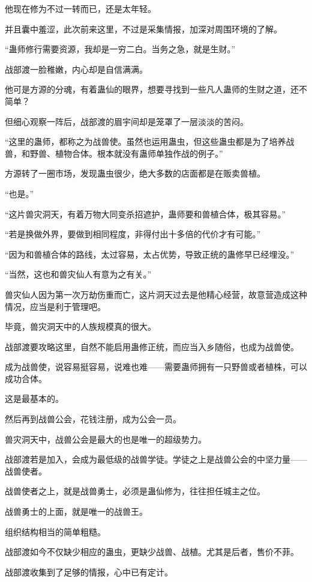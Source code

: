 \begin{this_body}
他现在修为不过一转而已，还是太年轻。

并且囊中羞涩，此次前来这里，不过是采集情报，加深对周围环境的了解。

“蛊师修行需要资源，我却是一穷二白。当务之急，就是生财。”

战部渡一脸稚嫩，内心却是自信满满。

他可是方源的分魂，有着蛊仙的眼界，想要寻找到一些凡人蛊师的生财之道，还不简单？

但细心观察一阵后，战部渡的眉宇间却是笼罩了一层淡淡的苦闷。

“这里的蛊师，都称之为战兽使。虽然也运用蛊虫，但这些蛊虫都是为了培养战兽，和野兽、植物合体。根本就没有蛊师单独作战的例子。”

方源转了一圈市场，发现蛊虫很少，绝大多数的店面都是在贩卖兽植。

“也是。”

“这片兽灾洞天，有着万物大同变杀招遮护，蛊师要和兽植合体，极其容易。”

“若是换做外界，要做到相同程度，非得付出十多倍的代价才有可能。”

“因为和兽植合体的路线，太过容易，太占优势，导致正统的蛊修早已经埋没。”

“当然，这也和兽灾仙人有意为之有关。”

兽灾仙人因为第一次万劫伤重而亡，这片洞天过去是他精心经营，故意营造成这种情况，应当是利于管理吧。

毕竟，兽灾洞天中的人族规模真的很大。

战部渡要攻略这里，自然不能启用蛊修正统，而应当入乡随俗，也成为战兽使。

成为战兽使，说容易挺容易，说难也难——需要蛊师拥有一只野兽或者植株，可以成功合体。

这是最基本的。

然后再到战兽公会，花钱注册，成为公会一员。

兽灾洞天中，战兽公会是最大的也是唯一的超级势力。

战部渡若是加入，会成为最低级的战兽学徒。学徒之上是战兽公会的中坚力量——战兽使者。

战兽使者之上，就是战兽勇士，必须是蛊仙修为，往往担任城主之位。

战兽勇士的上面，就是唯一的战兽王。

组织结构相当的简单粗糙。

战部渡如今不仅缺少相应的蛊虫，更缺少战兽、战植。尤其是后者，售价不菲。

战部渡收集到了足够的情报，心中已有定计。


\end{this_body}
